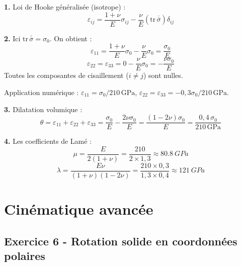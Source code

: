 \documentclass[12pt,a4paper]{article}
\begin{document}
\begin{boitecorrige}
\textbf{1.} Loi de Hooke généralisée (isotrope) :
\[
\varepsilon_{ij} = \frac{1+\nu}{E}\sigma_{ij} - \frac{\nu}{E}(\mathrm{tr}\,\overline{\overline{\sigma}})\delta_{ij}
\]

\textbf{2.} Ici $\mathrm{tr}\,\overline{\overline{\sigma}} = \sigma_0$. On obtient :
\[
\varepsilon_{11} = \frac{1+\nu}{E}\sigma_0 - \frac{\nu}{E}\sigma_0 = \frac{\sigma_0}{E}
\]
\[
\varepsilon_{22} = \varepsilon_{33} = 0 - \frac{\nu}{E}\sigma_0 = -\frac{\nu\sigma_0}{E}
\]
Toutes les composantes de cisaillement ($i\neq j$) sont nulles.

Application numérique : $\varepsilon_{11} = \sigma_0/210\,\text{GPa}$, $\varepsilon_{22}=\varepsilon_{33}=-0{,}3\sigma_0/210\,\text{GPa}$.

\textbf{3.} Dilatation volumique :
\[
\theta = \varepsilon_{11}+\varepsilon_{22}+\varepsilon_{33} = \frac{\sigma_0}{E} - \frac{2\nu\sigma_0}{E} = \frac{(1-2\nu)\sigma_0}{E} = \frac{0{,}4\,\sigma_0}{210\,\text{GPa}}
\]

\textbf{4.} Les coefficients de Lamé :
\[
\mu = \frac{E}{2(1+\nu)} = \frac{210}{2\times1{,}3} \approx \qty{80.8}{GPa}
\]
\[
\lambda = \frac{E\nu}{(1+\nu)(1-2\nu)} = \frac{210\times0{,}3}{1{,}3\times0{,}4} \approx \qty{121}{GPa}
\]
\end{boitecorrige}


\section{Cinématique avancée}

\subsection*{Exercice 6 - Rotation solide en coordonnées polaires \niveau{\difficile}}
\end{document}
